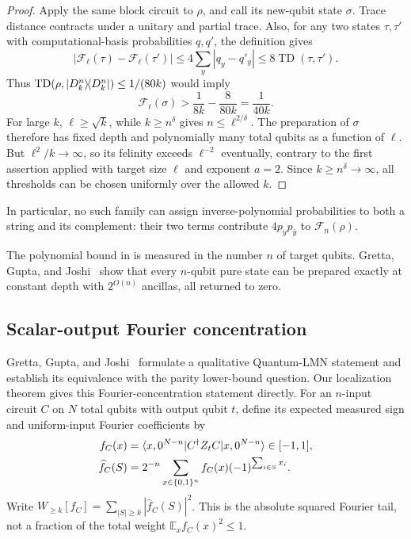 \begin{proof}
Apply the same block circuit to $\rho$, and call its new-qubit state
$\sigma$. Trace distance contracts under a unitary and partial trace.
Also, for any two states $\tau,\tau'$ with computational-basis
probabilities $q,q'$, the definition gives
\[
 |\mathcal F_\ell(\tau)-\mathcal F_\ell(\tau')|
 \le4\sum_y|q_y-q'_y|
 \le8\operatorname{TD}(\tau,\tau').
\]
Thus $\operatorname{TD}(\rho,\lvert D_k^n\rangle\!\langle D_k^n\rvert)\le1/(80k)$ would imply
\[
 \mathcal F_\ell(\sigma)>\frac1{8k}-\frac8{80k}
 =\frac1{40k}.
\]
For large $k$, $\ell\ge\sqrt k$, while $k\ge n^\delta$ gives
$n\le\ell^{2/\delta}$. The preparation of $\sigma$ therefore has fixed
depth and polynomially many total qubits as a function of $\ell$.
But $\ell^2/k\to\infty$, so its felinity exceeds $\ell^{-2}$ eventually,
contrary to the first assertion applied with target size $\ell$ and
exponent $a=2$. Since $k\ge n^\delta\to\infty$, all thresholds can be
chosen uniformly over the allowed $k$.
\end{proof}

In particular, no such family can assign inverse-polynomial
probabilities to both a string and its complement: their two terms
contribute $4p_y p_{\bar y}$ to $\mathcal F_n(\rho)$.

The polynomial bound in  is measured in the
number $n$ of target qubits. Gretta, Gupta, and
Joshi~\cite[Theorem~1.1]{GGJ2026StatePreparation} show that every $n$-qubit
pure state can be prepared exactly at constant depth with $2^{O(n)}$
ancillas, all returned to zero.

\subsection{Scalar-output Fourier concentration}

Gretta, Gupta, and Joshi~\cite[Conjecture~1 and Corollary~1.2]{GGJ2026}
formulate a qualitative Quantum-LMN statement and establish its
equivalence with the parity lower-bound question. Our localization
theorem gives this Fourier-concentration statement directly.
For an $n$-input circuit $C$ on $N$ total qubits with output qubit $t$,
define its expected measured sign and uniform-input Fourier coefficients by
\begin{align*}
 f_C(x)&=\langle x,0^{N-n}\rvert C^\dagger Z_tC\lvert x,0^{N-n}\rangle\in[-1,1],\\
 \widehat f_C(S)&=2^{-n}\sum_{x\in\{0,1\}^n}
 f_C(x)(-1)^{\sum_{i\in S}x_i}.
\end{align*}
Write $W_{\ge k}[f_C]=\sum_{|S|\ge k}|\widehat f_C(S)|^2$.
This is the absolute squared Fourier tail, not a fraction of the
total weight $\mathbb E_x f_C(x)^2\le1$.

